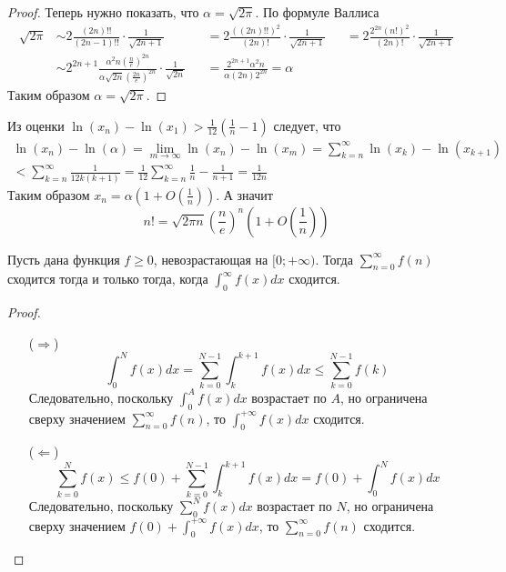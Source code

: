 \documentclass[12pt,a4paper]{article}
\begin{document}
\begin{proof}
        Теперь нужно показать, что $\alpha = \sqrt{2 \pi}$. По формуле Валлиса
        \begin{align*}
            \sqrt{2\pi}
            &\sim 2 \frac{(2n)!!}{(2n-1)!!} \cdot \frac{1}{\sqrt{2n+1}}&
            &= 2 \frac{((2n)!!)^2}{(2n)!} \cdot \frac{1}{\sqrt{2n+1}}&
            &= 2 \frac{2^{2n}(n!)^2}{(2n)!} \cdot \frac{1}{\sqrt{2n+1}}\\
            &\sim 2^{2n+1} \frac{\alpha^2 n \left(\frac{n}{e}\right)^{2n}}{\alpha \sqrt{2n} \left(\frac{2n}{e}\right)^{2n}} \cdot \frac{1}{\sqrt{2n}}&
            &= \frac{2^{2n+1} \alpha^2 n}{\alpha (2n) 2^{2n}} = \alpha
        \end{align*}
        Таким образом $\alpha = \sqrt{2 \pi}$.
    \end{proof}

    \begin{remark}
        Из оценки $\ln(x_n) - \ln(x_1) > \frac{1}{12} (\frac{1}{n} - 1)$ следует, что
        \begin{multline*}
            \ln(x_n) - \ln(\alpha)
            = \lim_{m \to \infty} \ln(x_n) - \ln(x_m)
            = \sum_{k=n}^\infty \ln(x_k) - \ln(x_{k+1})\\
            < \sum_{k=n}^\infty \frac{1}{12k(k+1)}
            = \frac{1}{12} \sum_{k=n}^\infty \frac{1}{n} - \frac{1}{n+1}
            = \frac{1}{12n}
        \end{multline*}
        Таким образом $x_n = \alpha (1 + O(\frac{1}{n}))$. А значит
        \[n! = \sqrt{2 \pi n} \left(\frac{n}{e}\right)^n \left(1 + O\left(\frac{1}{n}\right)\right)\]
    \end{remark}

    \begin{lemma}
        Пусть дана функция $f \geqslant 0$, невозрастающая на $[0; +\infty)$. Тогда $\sum_{n=0}^\infty f(n)$ сходится тогда и только тогда, когда $\int_0^\infty f(x)dx$ сходится.
    \end{lemma}

    \begin{proof}
        \begin{itemize}
            \item[($\Rightarrow$)] \[\int_0^N f(x)dx = \sum_{k=0}^{N-1} \int_k^{k+1} f(x)dx \leqslant \sum_{k=0}^{N-1} f(k)\]
                Следовательно, поскольку $\int_0^A f(x)dx$ возрастает по $A$, но ограничена сверху значением $\sum_{n=0}^\infty f(n)$, то $\int_0^{+\infty} f(x)dx$ сходится.
            \item[($\Leftarrow$)] \[\sum_{k=0}^N f(x) \leqslant f(0) + \sum_{k=0}^{N-1} \int_k^{k+1} f(x)dx = f(0) + \int_0^N f(x)dx\]
                Следовательно, поскольку $\sum_0^N f(x)dx$ возрастает по $N$, но ограничена сверху значением $f(0) + \int_0^{+\infty} f(x)dx$, то $\sum_{n=0}^\infty f(n)$ сходится.
        \end{itemize}
    \end{proof}
\end{document}

